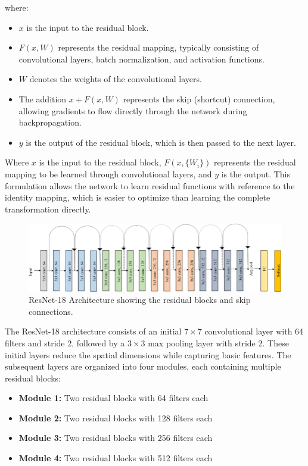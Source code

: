 \documentclass[
  twocolumn,
  10pt,
  a4paper,
  journal
]{IEEEtran}
\begin{document}
where:
\begin{itemize}
\item $x$ is the input to the residual block.
\item $F(x, W)$ represents the residual mapping, typically consisting of convolutional layers, batch normalization, and activation functions.
\item $W$ denotes the weights of the convolutional layers.
\item The addition $x + F(x, W)$ represents the skip (shortcut) connection, allowing gradients to flow directly through the network during backpropagation.
\item $y$ is the output of the residual block, which is then passed to the next layer.
\end{itemize}

Where $x$ is the input to the residual block, $F(x, \{W_i\})$ represents the residual mapping to be learned through convolutional layers, and $y$ is the output. This formulation allows the network to learn residual functions with reference to the identity mapping, which is easier to optimize than learning the complete transformation directly.

\begin{figure}[!t]
\centering
\includegraphics[width=\columnwidth]{figures/figure2.png}
\caption{ResNet-18 Architecture showing the residual blocks and skip connections.}
\label{fig:resnet18}
\end{figure}

The ResNet-18 architecture consists of an initial $7 \times 7$ convolutional layer with 64 filters and stride 2, followed by a $3 \times 3$ max pooling layer with stride 2. These initial layers reduce the spatial dimensions while capturing basic features. The subsequent layers are organized into four modules, each containing multiple residual blocks:

\begin{itemize}
\item \textbf{Module 1:} Two residual blocks with 64 filters each
\item \textbf{Module 2:} Two residual blocks with 128 filters each
\item \textbf{Module 3:} Two residual blocks with 256 filters each
\item \textbf{Module 4:} Two residual blocks with 512 filters each
\end{itemize}
\end{document}
